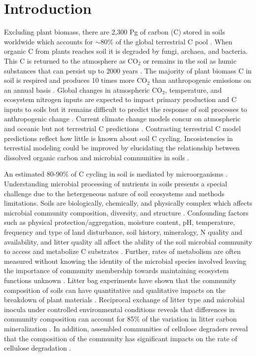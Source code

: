 \section{Introduction}
Excluding plant biomass, there are 2,300 Pg of carbon (C) stored in soils
worldwide which accounts for $\sim$80\% of the global terrestrial C pool
\citep{Amundson_2001,BATJES_1996}. When organic C from plants reaches soil it
is degraded by fungi, archaea, and bacteria. This C is returned to the
atmosphere as CO$_{2}$ or remains in the soil as humic substances that can
persist up to 2000 years \citep{yanagita1990natural}. The majority of plant
biomass C in soil is respired and produces 10 times more CO$_{2}$ than
anthropogenic emissions on an annual basis \citep{chapin2002principles}.
Global changes in atmospheric CO$_{2}$, temperature, and ecosystem nitrogen
inputs are expected to impact primary production and C inputs to soils
\citep{Groenigen_2006} but it remains difficult to predict the response of soil
processes to anthropogenic change \citep{DAVIDSON_2006}. Current climate change
models concur on atmospheric and oceanic but not terrestrial C predictions
\citep{Friedlingstein_2006}. Contrasting terrestrial C model predictions
reflect how little is known about soil C cycling.  Incosistencies in terrestial
modeling could be improved by elucidating the relationship between dissolved
organic carbon and microbial communities in soils \citep{Neff_2001}.

An estimated 80-90\% of C cycling in soil is mediated by microorganisms
\citep{ColemanCrossley_1996,Nannipieri_2003}. Understanding microbial
processing of nutrients in soils presents a special challenge due to the
hetergeneous nature of soil ecosystems and methods limitations. Soils are
biologically, chemically, and physically complex which affects microbial
community composition, diversity, and structure \citep{Nannipieri_2003}.
Confounding factors such as physical protection/aggregation, moisture content,
pH, temperature, frequency and type of land disturbance, soil history,
mineralogy, N quality and availability, and litter quality all affect the
ability of the soil microbial community to access and metabolize C substrates
\citep{Sollins_Homann_Caldwell_1996,Kalbitz_2000}. Further, rates of metabolism
are often measured without knowing the identity of the microbial species
involved \citep{ndi_Pietramellara_Renella_2003} leaving the importance of
community membership towards maintaining ecosystem functions unknown
\citep{Allison_2008,ndi_Pietramellara_Renella_2003,Schimel_2012}. Litter bag
experiments have shown that the community composition of soils can have
quantitative and qualitative impacts on the breakdown of plant materials
\citep{Schimel_1995}. Reciprocal exchange of litter type and microbial inocula
under controlled environmental conditions reveals that differences in community
composition can account for 85\% of the variation in litter carbon
mineralization \citep{Strickland_2009}. In addition, assembled communities of
cellulose degraders reveal that the composition of the community has
significant impacts on the rate of cellulose degradation \citep{Wohl_2004}. 

